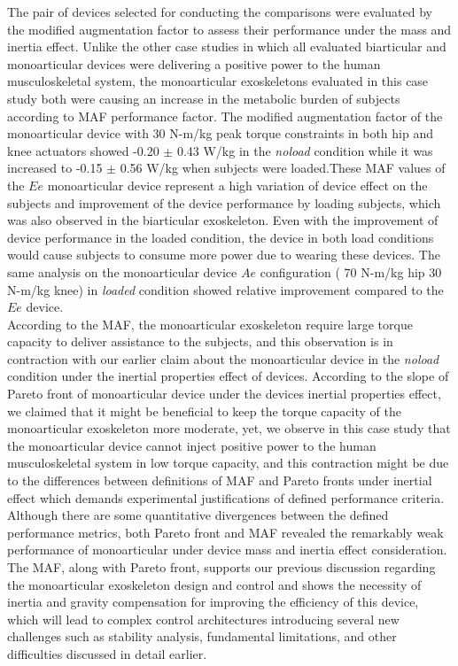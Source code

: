 \documentclass[10pt,letterpaper]{article}
\begin{document}
The pair of devices selected for conducting the comparisons were evaluated by the modified augmentation factor to assess their performance under the mass and inertia effect. Unlike the other case studies in which all evaluated biarticular and monoarticular devices were delivering a positive power to the human musculoskeletal system, the monoarticular exoskeletons evaluated in this case study both were causing an increase in the metabolic burden of subjects according to MAF performance factor. The modified augmentation factor of the monoarticular device with 30 N-m/kg peak torque constraints in both hip and knee actuators showed -0.20 $\pm$ 0.43 W/kg in the {\it noload} condition while it was increased to -0.15 $\pm$ 0.56 W/kg when subjects were loaded.These MAF values of the $Ee$ monoarticular device represent a high variation of device effect on the subjects and improvement of the device performance by loading subjects, which was also observed in the biarticular exoskeleton. Even with the improvement of device performance in the loaded condition, the device in both load conditions would cause subjects to consume more power due to wearing these devices. The same analysis on the monoarticular device $Ae$ configuration ( 70  N-m/kg hip 30 N-m/kg knee) in  {\it loaded} condition showed relative improvement compared to the $Ee$ device.\\
According to the MAF, the monoarticular exoskeleton require large torque capacity to deliver assistance to the subjects, and this observation is in contraction with our earlier claim about the monoarticular device in the {\it noload}  condition under the inertial properties effect of devices. According to the slope of Pareto front of monoarticular device under the devices inertial properties effect, we claimed that it might be beneficial to keep the torque capacity of the monoarticular exoskeleton more moderate, yet, we observe in this case study that the monoarticular device cannot inject positive power to the human musculoskeletal system in low torque capacity, and this contraction might be due to the differences between definitions of MAF and Pareto fronts under inertial effect which demands experimental justifications of defined performance criteria.\\
Although there are some quantitative divergences between the defined performance metrics, both Pareto front and MAF revealed the remarkably weak performance of monoarticular under device mass and inertia effect consideration. The MAF, along with Pareto front, supports our previous discussion regarding the monoarticular exoskeleton design and control and shows the necessity of inertia and gravity compensation for improving the efficiency of this device, which will lead to complex control architectures introducing several new challenges such as stability analysis, fundamental limitations, and other difficulties discussed in detail earlier.\\
\end{document}
